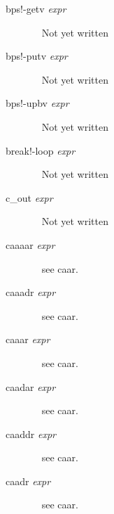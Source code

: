 \documentclass[a4paper,11pt]{article}
\begin{document}
\begin{description}
\item [{\ttfamily bps!-getv} {\itshape  expr}]  ~\newline
Not yet written

\item [{\ttfamily bps!-putv} {\itshape  expr}]  ~\newline
Not yet written

\item [{\ttfamily bps!-upbv} {\itshape  expr}]  ~\newline
Not yet written

\item [{\ttfamily break!-loop} {\itshape  expr}]  ~\newline
Not yet written

\item [{\ttfamily c\_out} {\itshape  expr}]  ~\newline
Not yet written

\item[{\ttfamily caaaar} {\itshape expr}]  ~\newline
see {\ttfamily caar}.

\item[{\ttfamily caaadr} {\itshape expr}]  ~\newline
see {\ttfamily caar}.

\item[{\ttfamily caaar} {\itshape expr}]  ~\newline
see {\ttfamily caar}.

\item[{\ttfamily caadar} {\itshape expr}]  ~\newline
see {\ttfamily caar}.

\item[{\ttfamily caaddr} {\itshape expr}]  ~\newline
see {\ttfamily caar}.

\item[{\ttfamily caadr} {\itshape expr}]  ~\newline
see {\ttfamily caar}.


\end{description}
\end{document}
